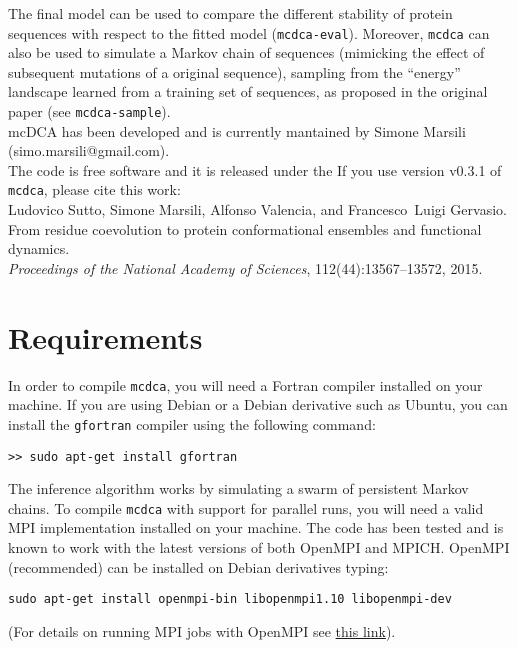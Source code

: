 \documentclass[a4paper,onecolumn]{article}
\begin{document}
The final model can be used to compare the different stability of protein sequences with respect to the fitted model (\verb|mcdca-eval|). Moreover,
\verb|mcdca| can also be used to simulate a Markov chain of sequences (mimicking the effect of subsequent mutations of a original sequence), sampling from
the ``energy'' landscape learned from a training set of sequences, as proposed in the original paper\cite{sutto2015residue} (see \verb|mcdca-sample|).
\\[8cm]
mcDCA has been developed and is currently mantained by Simone Marsili (simo.marsili@gmail.com).\\
The code is free software and it is released under the 
If you use version v0.3.1 of \verb|mcdca|, please cite this work:\\
Ludovico Sutto, Simone Marsili, Alfonso Valencia, and Francesco~Luigi Gervasio.\\
From residue coevolution to protein conformational ensembles and functional dynamics.\\
{\em Proceedings of the National Academy of Sciences}, 112(44):13567--13572, 2015.

\newpage
\section{Requirements}
\label{sec:requirements}

In order to compile \verb|mcdca|, you will need a Fortran compiler installed on your machine.   
If you are using Debian or a Debian derivative such as Ubuntu, you can install the \verb|gfortran| compiler using the following command:
\begin{verbatim}
>> sudo apt-get install gfortran
\end{verbatim}

The inference algorithm works by simulating a swarm of persistent Markov chains. 
To compile \verb|mcdca| with support for parallel runs,
you will need a valid MPI implementation installed on your machine. 
The code has been tested and is known to work with the latest versions of both OpenMPI and MPICH.   
OpenMPI (recommended) can be installed on Debian derivatives typing:
\begin{verbatim}
sudo apt-get install openmpi-bin libopenmpi1.10 libopenmpi-dev
\end{verbatim}
(For details on running MPI jobs with OpenMPI see \href{https://www.open-mpi.org/faq/?category=running}{this link}).
\\\
\end{document}

